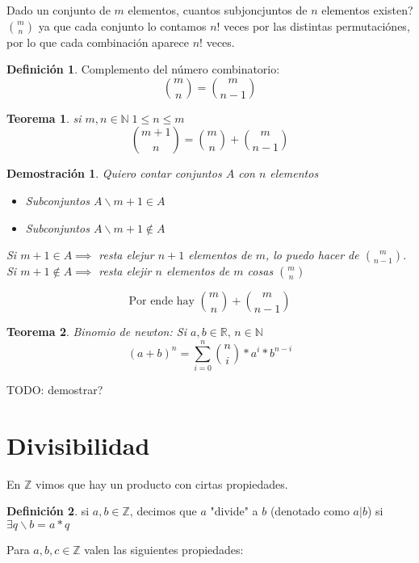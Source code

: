 \documentclass[9pt,a4paper,draft]{article}
\theoremstyle{definition}
\newtheorem{defi}{Definición}
\theoremstyle{plain}
\newtheorem{teo}{Teorema}
\newtheorem{demo}{Demostración}[teo]
\begin{document}
Dado un conjunto de $m$ elementos, cuantos subjoncjuntos de $n$ elementos existen? $\binom{m}{n}$ ya que cada conjunto lo contamos $n!$ veces por las distintas permutaciónes, por lo que cada combinación aparece $n!$ veces.

\begin{defi} Complemento del número combinatorio: $$\binom{m}{n}=\binom{m}{n-1}$$\end{defi}

\begin{teo} si $m,n\in{\mathbb{N}}\;1\leq{n}\leq{m}$ $$\binom{m+1}{n}=\binom{m}{n} + \binom{m}{n-1}$$ \end{teo}

\begin{demo}
Quiero contar conjuntos $A$ con $n$ elementos

\begin{itemize}
\item Subconjuntos $A\backslash m+1\in{A}$
\item Subconjuntos $A\backslash m+1\notin{A}$
\end{itemize}

Si $m+1\in{A}\implies$ resta elejur $n+1$ elementos de $m$, lo puedo hacer de $\binom{m}{n-1}$.\\

Si $m+1\notin{A}\implies$ resta elejir $n$ elementos de $m$ cosas $\binom{m}{n}$

$$\text{Por ende hay } \binom{m}{n} + \binom{m}{n-1}$$

\end{demo}

\begin{teo} Binomio de newton: Si $a,b\in{\mathbb{R}},\, n\in{\mathbb{N}}$
$$(a+b)^n = \displaystyle\sum_{i=0}^{n} \binom{n}{i}*a^i*b^{n-i}$$
\end{teo}

TODO: demostrar?

\part{Divisibilidad}

En $\mathbb{Z}$ vimos que hay un producto con cirtas propiedades.

\begin{defi} si $a,b\in{\mathbb{Z}}$, decimos que $a$ "divide" a $b$ (denotado como $a|b$) si $\exists{q}\backslash b=a*q$\end{defi}

Para $a,b,c\in{\mathbb{Z}}$ valen las siguientes propiedades:
\end{document}
